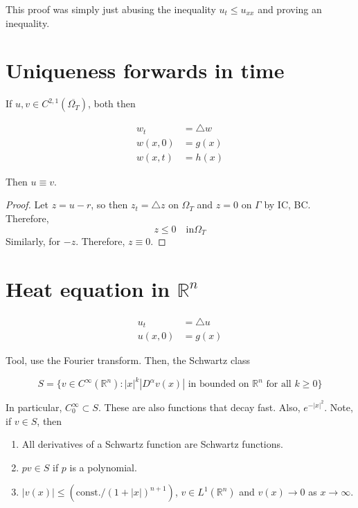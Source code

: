 \documentclass{article}
\newtheorem{one minute paper}[theorem]{One Minute Paper}
\begin{document}
This proof was simply just abusing the inequality $u_t \leq u_{xx}$ and proving an inequality. 

\section*{Uniqueness forwards in time}

If $u,v \in C^{2,1}(\overline{\Omega_T})$, both then 

\begin{align*}
    w_t &= \triangle w \\
    w(x,0) &= g(x) \\
    w(x,t) &= h(x)
\end{align*}

Then $u \equiv v$. 

\begin{proof}
    Let $z = u - r$, so then $z_t = \triangle z$ on $\Omega_T$ and $z=0$ on $\Gamma$ by IC, BC. Therefore, 
    \begin{equation}
        z \leq 0 \quad \text{in} \Omega_T
    \end{equation}
    Similarly, for $-z$. Therefore, $z \equiv 0$. 
\end{proof}

\section*{Heat equation in $\mathbb{R}^n$}

\begin{align*}
    u_t &= \triangle u \\
    u(x,0) &= g(x)
\end{align*}

Tool, use the Fourier transform. Then, the Schwartz class 

\begin{equation}
    S = \{v \in C^{\infty}(\mathbb{R}^n): |x|^k|D^{\alpha}v(x)| \text{ in bounded on $\mathbb{R}^n$ for all $k \geq 0$}\}
\end{equation}

In particular, $C^{\infty}_{0} \subset S$. These are also functions that decay fast. Also, $e^{-|x|^2}$. Note, if $v \in S$, then 

\begin{enumerate}
    \item All derivatives of a Schwartz function are Schwartz functions. 
    \item $pv \in S$ if $p$ is a polynomial. 
    \item $|v(x)| \leq (\text{const.}/(1 + |x|)^{n+1})$, $v \in L^1(\mathbb{R}^n)$ and $v(x) \rightarrow 0$ as $x \rightarrow \infty$. 
\end{enumerate}
\end{document}
